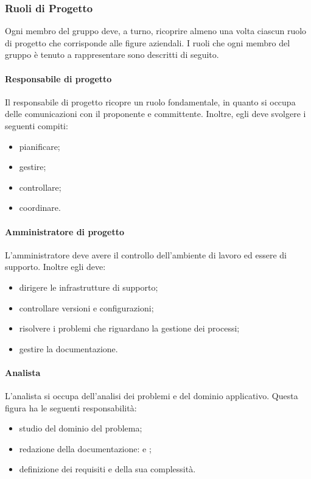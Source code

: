 \subsubsection{Ruoli di Progetto}
Ogni membro del gruppo deve, a turno, ricoprire almeno una volta ciascun ruolo di progetto che corrisponde alle figure aziendali. I ruoli che ogni membro del gruppo è tenuto a rappresentare sono descritti di seguito.

\paragraph{Responsabile di progetto}
Il responsabile di progetto ricopre un ruolo fondamentale, in quanto si occupa delle comunicazioni con il proponente e committente. Inoltre, egli deve svolgere i seguenti compiti:
\begin{itemize}
\item pianificare;
\item gestire;
\item controllare;
\item coordinare.
\end{itemize}

\paragraph{Amministratore di progetto}
L'amministratore deve avere il controllo dell'ambiente di lavoro ed essere di supporto. Inoltre egli deve: 
\begin{itemize}
\item dirigere le infrastrutture di supporto;
\item controllare versioni e configurazioni;
\item risolvere i problemi che riguardano la gestione dei processi;
\item gestire la documentazione.
\end{itemize}

\paragraph{Analista}
L'analista si occupa dell'analisi dei problemi e del dominio applicativo. Questa figura ha le seguenti responsabilità:
\begin{itemize}
\item studio del dominio del problema; 
\item redazione della documentazione: \AdR{} e \SdF{};
\item definizione dei requisiti e della sua complessità.
\end{itemize}

